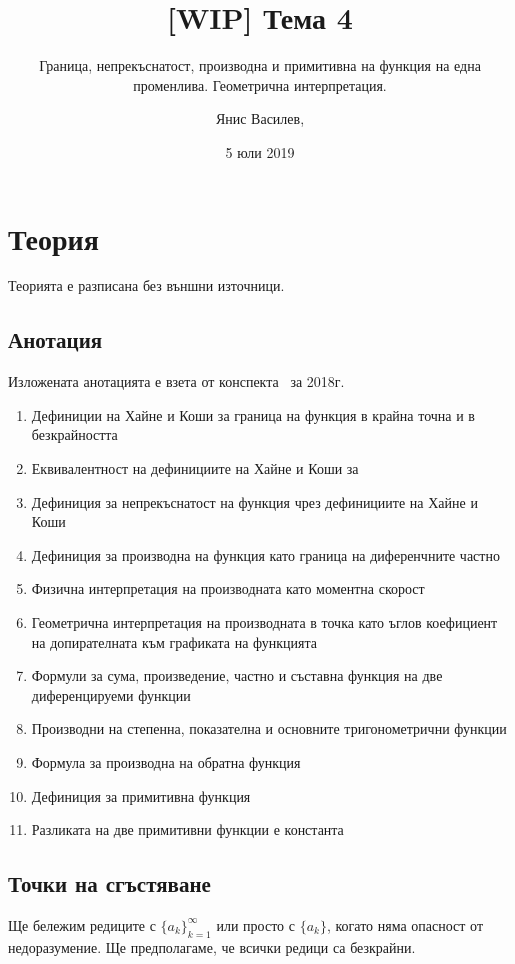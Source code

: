\documentclass[numbers=endperiod, DIV=15, bibliography=totocnumbered]{scrartcl}
\title{[WIP] Тема 4}
\subtitle{Граница, непрекъснатост, производна и примитивна на функция на една променлива. Геометрична интерпретация.}
\author{Янис Василев, \Email{ianis@ivasilev.net}}
\date{5 юли 2019}
\begin{document}
\maketitle

\section{Теория}

Теорията е разписана без външни източници.

\subsection{Анотация}

Изложената анотацията е взета от конспекта~\cite{Syllabus} за 2018г.

\begin{enumerate}
  \item Дефиниции на Хайне и Коши за граница на функция в крайна точна и в безкрайността
  \item Еквивалентност на дефинициите на Хайне и Коши за
  \item Дефиниция за непрекъснатост на функция чрез дефинициите на Хайне и Коши
  \item Дефиниция за производна на функция като граница на диференчните частно
  \item Физична интерпретация на производната като моментна скорост
  \item Геометрична интерпретация на производната в точка като ъглов коефициент на допирателната към графиката на функцията
  \item Формули за сума, произведение, частно и съставна функция на две диференцируеми функции
  \item Производни на степенна, показателна и основните тригонометрични функции
  \item Формула за производна на обратна функция
  \item Дефиниция за примитивна функция
  \item Разликата на две примитивни функции е константа
\end{enumerate}

\subsection{Точки на сгъстяване}

Ще бележим редиците с ${\{ a_k \}}_{k=1}^\infty$ или просто с $\{ a_k \}$, когато няма опасност от недоразумение. Ще предполагаме, че всички редици са безкрайни.
\end{document}
